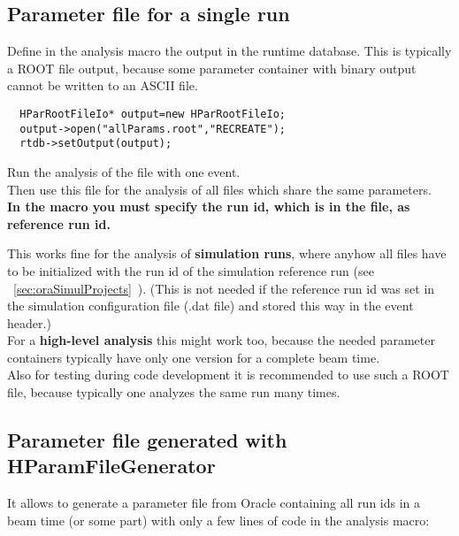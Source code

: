 \subsection[Parameter file for a single run]{Parameter file for a single run}
Define in the analysis macro the output in the runtime database.
This is typically a ROOT file output, because some parameter container with binary output cannot be written to an ASCII file.
\begin{lstlisting}
  HParRootFileIo* output=new HParRootFileIo;
  output->open("allParams.root","RECREATE");
  rtdb->setOutput(output);
\end{lstlisting}
Run the analysis of the file with one event.\\

Then use this file for the analysis of all files which share the same parameters.\\ 
\textbf{In the macro you must specify the run id, which is in the file, as reference run id.}

This works fine for the analysis of \textbf{simulation runs}, where anyhow all files have to be initialized with the run id 
of the simulation reference run (see ~\ref{sec:oraSimulProjects}~).
(This is not needed if the reference run id was set in the simulation configuration file (.dat file) and stored this way 
in the event header.)\\
For a \textbf{high-level analysis} this might work too, because the needed parameter containers typically have only one 
version for a complete beam time.\\

Also for testing during code development it is recommended to use such a ROOT file, because typically one analyzes the same 
run many times.


\subsection[Parameter file generated with HParamFileGenerator]{Parameter file generated with HParamFileGenerator} 
\label{sec:rtdbHParamFileGenerator}

It allows to generate a parameter file from Oracle containing all run ids in a beam time (or some part) with only a few 
lines of code in the analysis macro:

